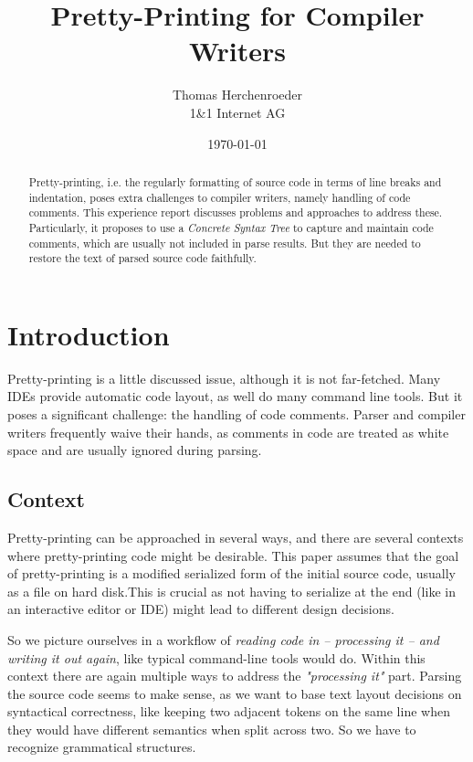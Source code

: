\documentclass[11pt,a4paper]{article}
\begin{document}
\title{Pretty-Printing for Compiler Writers}
\author{
Thomas Herchenroeder\\
1\&1 Internet AG
}

\date{\today}
\maketitle

\begin{abstract} 
Pretty-printing, i.e. the regularly formatting of source code
in terms of line breaks and indentation, poses extra challenges to compiler
writers, namely handling of code comments. This experience report discusses problems and
approaches to address these. Particularly, it proposes to use a \emph{Concrete
Syntax Tree} to capture and maintain code comments, which are usually not
included in parse results. But they are needed to restore the text of parsed
source code faithfully.
\end{abstract}

\section{Introduction}
Pretty-printing is a little discussed issue, although it is not
far-fetched. Many IDEs provide automatic code layout, as well do many command
line tools. But it poses a significant
challenge: the handling of code comments. Parser and compiler writers
frequently waive their hands, as comments in code are treated as white space and
are usually ignored during parsing.

\subsection{Context}

Pretty-printing can be approached in several ways, and there are several
contexts where pretty-printing code might be desirable. This paper assumes that
the goal of pretty-printing is a modified serialized form of the initial source
code, usually as a file on hard disk.This is crucial as not having to serialize
at the end (like in an interactive editor or IDE) might lead to different design
decisions.

So we picture ourselves in a workflow of \emph{reading code in --
processing it -- and writing it out again}, like typical command-line tools
would do. Within this context there are again multiple ways to address the
\emph{"processing it"} part. Parsing the source code seems to make sense, as we
want to base text layout decisions on syntactical correctness, like keeping two
adjacent tokens on the same line when they would have different semantics when
split across two. So we have to recognize grammatical structures.
\end{document}
